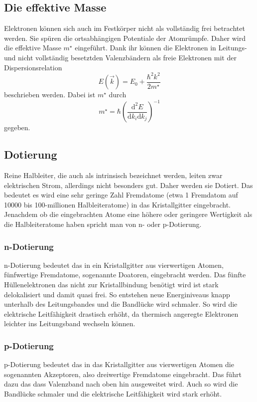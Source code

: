 \subsection{Die effektive Masse}
\label{sec:effektiveMasse}
Elektronen können sich auch im Festkörper nicht als vollständig frei betrachtet werden. Sie spüren die 
ortsabhängigen Potentiale der Atomrümpfe. Daher wird die effektive Masse $m^{\star}$ eingeführt. 
Dank ihr können die Elektronen in Leitungs- und nicht vollständig besetztden Valenzbändern als freie Elektronen
mit der Dispersionsrelation
\begin{equation}
  \label{eq:dispersionsrelation}
  E(\vec{k})=E_0+\frac{\hbar^2k^2}{2m^{\star}}
\end{equation}
beschrieben werden. Dabei ist $m^{\star}$ durch 
\begin{equation*}
  m^{\star}=\hbar(\frac{\mathrm{d}^2E}{\mathrm{d}k_i\mathrm{d}k_j})^{-1}
\end{equation*}
gegeben.
\subsection{Dotierung}
\label{sec:dotierung}
Reine Halbleiter, die auch als intrinsisch bezeichnet werden, leiten zwar elektrischen Strom, allerdings nicht
besonders gut. Daher werden sie Dotiert. Das bedeutet es wird eine sehr geringe Zahl Fremdatome (etwa 1 
Fremdatom auf 10000 bis 100-millionen Halbleiteratome) in das Kristallgitter eingebracht. Jenachdem ob die 
eingebrachten Atome eine höhere oder geringere Wertigkeit als die Halbleiteratome haben spricht man von 
n- oder p-Dotierung.
\subsubsection{n-Dotierung}
\label{sec:ndotierung}
n-Dotierung bedeutet das in ein Kristallgitter aus vierwertigen Atomen, fünfwertige Fremdatome,
sogenannte Doatoren, eingebracht werden. Das fünfte Hüllenelektronen das nicht zur Kristallbindung
benötigt wird ist stark delokalisiert und damit quasi frei. So entstehen neue Energiniveaus knapp unterhalb
des Leitungsbandes und die Bandlücke wird schmaler. So wird die elektrische Leitfähigkeit drastisch erhöht, 
da thermisch angeregte Elektronen leichter ins Leitungsband wechseln können.
\subsubsection{p-Dotierung}
\label{sec:pdotierung}
p-Dotierung bedeutet das in das Kristallgitter aus vierwertigen Atomen die sogenannten Akzeptoren, also
dreiwertige Fremdatome eingebracht. Das führt dazu das dass Valenzband nach oben hin ausgeweitet wird.
Auch so wird die Bandlücke schmaler und die elektrische Leitfähigkeit wird stark erhöht.
